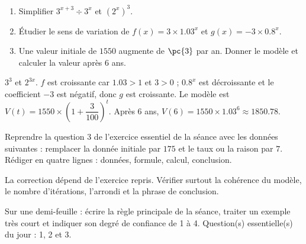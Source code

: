 \begin{exercise}[essentiel]
\begin{enumerate}\item Simplifier $3^{x+3}\div3^x$ et $(2^x)^3$.\item Étudier le sens de variation de $f(x)=3\times\num{1,03}^x$ et $g(x)=-3\times\num{0,8}^x$.\item Une valeur initiale de $1550$ augmente de $\pc{3}$ par an. Donner le modèle et calculer la valeur après $6$ ans.\end{enumerate}
\end{exercise}
\begin{solution}$3^3$ et $2^{3x}$. $f$ est croissante car $\num{1,03}>1$ et $3>0$ ; $\num{0,8}^x$ est décroissante et le coefficient $-3$ est négatif, donc $g$ est croissante. Le modèle est $V(t)=1550\times\left(1+\dfrac{3}{100}\right)^t$. Après $6$ ans, $V(6)=1550\times\num{1,03}^6\approx\num{1850,78}$.\end{solution}


\begin{homework}Reprendre la question 3 de l'exercice essentiel de la séance avec les données suivantes : remplacer la donnée initiale par $175$ et le taux ou la raison par $7$. Rédiger en quatre lignes : données, formule, calcul, conclusion.\end{homework}
\begin{solution}La correction dépend de l'exercice repris. Vérifier surtout la cohérence du modèle, le nombre d'itérations, l'arrondi et la phrase de conclusion.\end{solution}

\begin{exitticket}[3 minutes]Sur une demi-feuille : écrire la règle principale de la séance, traiter un exemple très court et indiquer son degré de confiance de 1 à 4. Question(s) essentielle(s) du jour : 1, 2 et 3.\end{exitticket}

